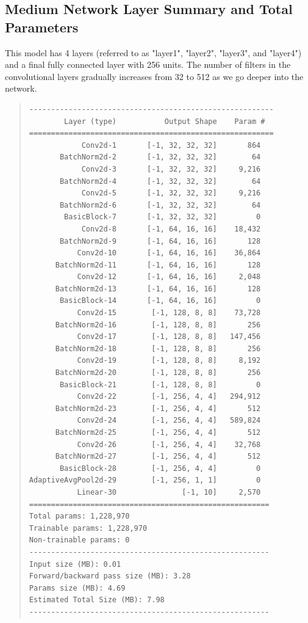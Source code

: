 \documentclass[letterpaper]{article} %
\begin{document}
\subsection{Medium Network Layer Summary and Total Parameters}
This model has 4 layers (referred to as "layer1", "layer2", "layer3", and "layer4") and a final fully connected layer with 256 units. The number of filters in the convolutional layers gradually increases from 32 to 512 as we go deeper into the network.
\begin{quote}
\begin{scriptsize}\begin{verbatim}
--------------------------------------------------------
        Layer (type)           Output Shape    Param #
========================================================
            Conv2d-1       [-1, 32, 32, 32]       864
       BatchNorm2d-2       [-1, 32, 32, 32]        64
            Conv2d-3       [-1, 32, 32, 32]     9,216
       BatchNorm2d-4       [-1, 32, 32, 32]        64
            Conv2d-5       [-1, 32, 32, 32]     9,216
       BatchNorm2d-6       [-1, 32, 32, 32]        64
        BasicBlock-7       [-1, 32, 32, 32]         0
            Conv2d-8       [-1, 64, 16, 16]    18,432
       BatchNorm2d-9       [-1, 64, 16, 16]       128
           Conv2d-10       [-1, 64, 16, 16]    36,864
      BatchNorm2d-11       [-1, 64, 16, 16]       128
           Conv2d-12       [-1, 64, 16, 16]     2,048
      BatchNorm2d-13       [-1, 64, 16, 16]       128
       BasicBlock-14       [-1, 64, 16, 16]         0
           Conv2d-15        [-1, 128, 8, 8]    73,728
      BatchNorm2d-16        [-1, 128, 8, 8]       256
           Conv2d-17        [-1, 128, 8, 8]   147,456
      BatchNorm2d-18        [-1, 128, 8, 8]       256
           Conv2d-19        [-1, 128, 8, 8]     8,192
      BatchNorm2d-20        [-1, 128, 8, 8]       256
       BasicBlock-21        [-1, 128, 8, 8]         0
           Conv2d-22        [-1, 256, 4, 4]   294,912
      BatchNorm2d-23        [-1, 256, 4, 4]       512
           Conv2d-24        [-1, 256, 4, 4]   589,824
      BatchNorm2d-25        [-1, 256, 4, 4]       512
           Conv2d-26        [-1, 256, 4, 4]    32,768
      BatchNorm2d-27        [-1, 256, 4, 4]       512
       BasicBlock-28        [-1, 256, 4, 4]         0
AdaptiveAvgPool2d-29        [-1, 256, 1, 1]         0
           Linear-30               [-1, 10]     2,570
=======================================================
Total params: 1,228,970
Trainable params: 1,228,970
Non-trainable params: 0
-------------------------------------------------------
Input size (MB): 0.01
Forward/backward pass size (MB): 3.28
Params size (MB): 4.69
Estimated Total Size (MB): 7.98
-------------------------------------------------------

\end{verbatim}\end{scriptsize}
\end{quote}
\end{document}
